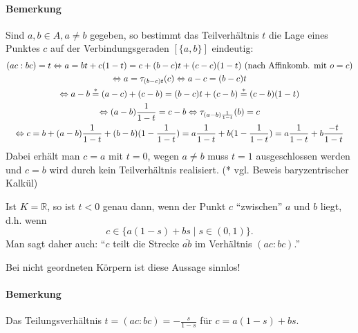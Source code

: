 \paragraph{Bemerkung}
	Sind $ a,b\in A,a\neq b $ gegeben, so bestimmt das Teilverhältnis $ t $ die Lage eines Punktes $ c $ auf der Verbindungsgeraden $ [\{a,b\}] $ eindeutig:
		\begin{gather*}
		(ac:bc) = t \Leftrightarrow a=bt+c(1-t) = c+ (b-c)t + (c-c)(1-t)\text{ (nach Affinkomb. mit $ o = c $)}\\
		\Leftrightarrow a=\tau_{(b-c)t}(c)\Leftrightarrow a-c = (b-c)t\\
		\Leftrightarrow a-b \overset{*}{=} (a-c)+(c-b) = (b-c)t + (c-b) \overset{*}{=} (c-b)(1-t)\\
		\Leftrightarrow (a-b)\frac{1}{1-t} = c-b \Leftrightarrow \tau_{(a-b)\frac{1}{1-t}}(b) = c\\
		\Leftrightarrow c = b+(a-b)\frac{1}{1-t} + (b-b)(1-\frac{1}{1-t}) = a\frac{1}{1-t}+b(1-\frac{1}{1-t})
		=a\frac{1}{1-t}+b\frac{-t}{1-t}
		\end{gather*}
	Dabei erhält man $ c = a $ mit $ t = 0 $, wegen $ a\neq b $ muss $ t=1 $ ausgeschlossen werden und $ c = b $ wird durch kein Teilverhältnis realisiert. (* vgl. Beweis baryzentrischer Kalkül)
	
	Ist $ K=\mathbb{R} $, so ist $ t<0 $ genau dann, wenn der Punkt $ c $ "`zwischen"' $ a $ und $ b $ liegt, d.h. wenn
		\[ c\in \{a(1-s)+bs\mid s\in (0,1)\}. \]
	Man sagt daher auch: "`$ c $ teilt die Strecke $ \overline{ab} $ im Verhältnis $ (ac:bc) $."'
	
	Bei nicht geordneten Körpern ist diese Aussage sinnlos!
	
\paragraph{Bemerkung}
	Das Teilungsverhältnis $ t = (ac:bc) = -\frac{s}{1-s} $ für $ c=a(1-s)+bs $.

